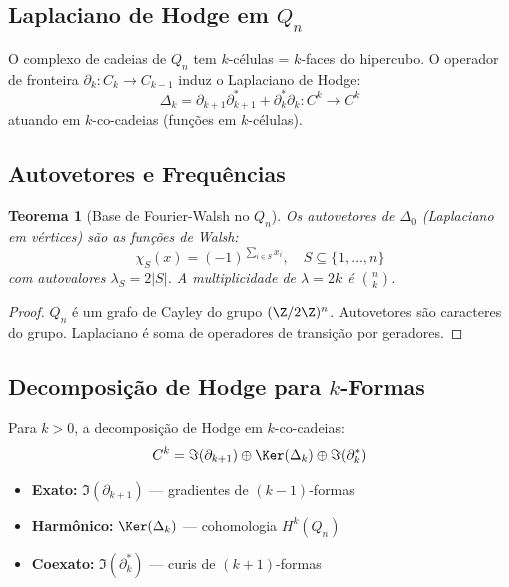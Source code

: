 \documentclass[11pt,a4paper]{article}
\newtheorem{theorem}{Teorema}[section]
\newcommand{\laplacian}{\Delta}
\begin{document}
\subsection{Laplaciano de Hodge em $Q_n$}

O complexo de cadeias de $Q_n$ tem $k$-células = $k$-faces do hipercubo. O operador de fronteira $\partial_k: C_k \to C_{k-1}$ induz o Laplaciano de Hodge:
\begin{equation}
    \laplacian_k = \partial_{k+1}\partial_{k+1}^* + \partial_k^*\partial_k : C^k \to C^k
\end{equation}
atuando em $k$-co-cadeias (funções em $k$-células).

\subsection{Autovetores e Frequências}

\begin{theorem}[Base de Fourier-Walsh no $Q_n$]
Os autovetores de $\laplacian_0$ (Laplaciano em vértices) são as funções de Walsh:
\begin{equation}
    \chi_S(x) = (-1)^{\sum_{i \in S} x_i}, \quad S \subseteq \{1,\dots,n\}
\end{equation}
com autovalores $\lambda_S = 2|S|$. A multiplicidade de $\lambda = 2k$ é $\binom{n}{k}$.
\end{theorem}

\begin{proof}
$Q_n$ é um grafo de Cayley do grupo $(\Z/2\Z)^n$. Autovetores são caracteres do grupo. Laplaciano é soma de operadores de transição por geradores.
\end{proof}

\subsection{Decomposição de Hodge para $k$-Formas}

Para $k > 0$, a decomposição de Hodge em $k$-co-cadeias:
\begin{equation}
    C^k = \Im(\partial_{k+1}) \oplus \Ker(\laplacian_k) \oplus \Im(\partial_k^*)
\end{equation}
\begin{itemize}
    \item \textbf{Exato:} $\Im(\partial_{k+1})$ — gradientes de $(k-1)$-formas
    \item \textbf{Harmônico:} $\Ker(\laplacian_k)$ — cohomologia $H^k(Q_n)$
    \item \textbf{Coexato:} $\Im(\partial_k^*)$ — curis de $(k+1)$-formas
\end{itemize}
\end{document}
